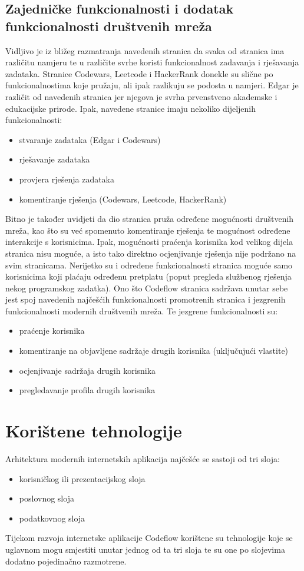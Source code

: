 \documentclass[times, utf8, zavrsni, numeric]{fer}
\begin{document}
		\section{Zajedničke funkcionalnosti i dodatak funkcionalnosti društvenih mreža}
		Vidljivo je iz bližeg razmatranja navedenih stranica da svaka od stranica ima različitu namjeru te u različite svrhe koristi funkcionalnost zadavanja i rješavanja zadataka. Stranice Codewars, Leetcode i HackerRank donekle su slične po funkcionalnostima koje pružaju, ali ipak razlikuju se podosta u namjeri. Edgar je različit od navedenih stranica jer njegova je svrha prvenstveno akademske i edukacijske prirode. Ipak, navedene stranice imaju nekoliko dijeljenih funkcionalnosti:
		\begin{itemize}
			\item stvaranje zadataka (Edgar i Codewars)
			\item rješavanje zadataka
			\item provjera rješenja zadataka
			\item komentiranje rješenja (Codewars, Leetcode, HackerRank)
		\end{itemize}
		Bitno je također uvidjeti da dio stranica pruža određene mogućnosti društvenih mreža, kao što su već spomenuto komentiranje rješenja te mogućnost određene interakcije s korisnicima. Ipak, mogućnosti praćenja korisnika kod velikog dijela stranica nisu moguće, a isto tako direktno ocjenjivanje rješenja nije podržano na svim stranicama. Nerijetko su i određene funkcionalnosti stranica moguće samo korisnicima koji plaćaju određenu pretplatu (poput pregleda službenog rješenja nekog programskog zadatka).
		Ono što Codeflow stranica sadržava unutar sebe jest spoj navedenih najčešćih funkcionalnosti promotrenih stranica i jezgrenih funkcionalnosti modernih društvenih mreža. Te jezgrene funkcionalnosti su:
		\begin{itemize}
			\item praćenje korisnika
			\item komentiranje na objavljene sadržaje drugih korisnika (uključujući vlastite)
			\item ocjenjivanje sadržaja drugih korisnika
			\item pregledavanje profila drugih korisnika
		\end{itemize}
	
	
	\chapter{Korištene tehnologije}
	\label{cha:tehnologije}
	Arhitektura modernih internetskih aplikacija najčešće se sastoji od tri sloja:
	\begin{itemize}
		\item korisničkog ili prezentacijskog sloja
		\item poslovnog sloja
		\item podatkovnog sloja
	\end{itemize}
	Tijekom razvoja internetske aplikacije Codeflow korištene su tehnologije koje se uglavnom mogu smjestiti unutar jednog od ta tri sloja te su one po slojevima dodatno pojedinačno razmotrene.
	
\end{document}
